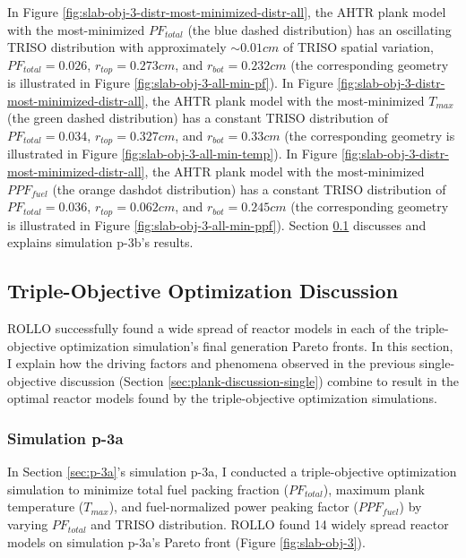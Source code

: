 In Figure \ref{fig:slab-obj-3-distr-most-minimized-distr-all}, the \gls{AHTR} plank model 
with the most-minimized $PF_{total}$ (the blue dashed distribution) has an 
oscillating TRISO distribution with approximately ${\sim}0.01cm$ of TRISO spatial variation, 
$PF_{total} = 0.026$, $r_{top}=0.273cm$, and $r_{bot}=0.232cm$ (the corresponding geometry 
is illustrated in Figure \ref{fig:slab-obj-3-all-min-pf}).
In Figure \ref{fig:slab-obj-3-distr-most-minimized-distr-all}, the \gls{AHTR} plank 
model with the most-minimized $T_{max}$ (the green dashed distribution) has a constant 
TRISO distribution of $PF_{total}=0.034$, $r_{top}=0.327cm$, and $r_{bot}=0.33cm$
(the corresponding geometry is illustrated in Figure \ref{fig:slab-obj-3-all-min-temp}).
In Figure \ref{fig:slab-obj-3-distr-most-minimized-distr-all}, the \gls{AHTR} plank 
model with the most-minimized $PPF_{fuel}$ (the orange dashdot distribution) has a 
constant TRISO distribution of $PF_{total} = 0.036$, $r_{top}=0.062cm$, and 
$r_{bot}=0.245cm$ (the corresponding geometry is illustrated in Figure 
\ref{fig:slab-obj-3-all-min-ppf}).
Section \ref{sec:plank-discussion-three} discusses and explains simulation p-3b's 
results.

\subsection{Triple-Objective Optimization Discussion}
\label{sec:plank-discussion-three} 
\gls{ROLLO} successfully found a wide spread of reactor models in each of the 
triple-objective optimization simulation's final generation Pareto fronts.
In this section, I explain how the driving factors and phenomena observed in 
the previous single-objective discussion (Section \ref{sec:plank-discussion-single}) 
combine to result in the optimal reactor models found by the triple-objective 
optimization simulations. 

\subsubsection{Simulation p-3a}
In Section \ref{sec:p-3a}'s simulation p-3a, I conducted a triple-objective 
optimization simulation to minimize total fuel packing fraction ($PF_{total}$), 
maximum plank temperature ($T_{max}$), and fuel-normalized power peaking factor 
($PPF_{fuel}$) by varying $PF_{total}$ and TRISO distribution.
\gls{ROLLO} found 14 widely spread reactor models on simulation p-3a's Pareto 
front (Figure \ref{fig:slab-obj-3}). 

